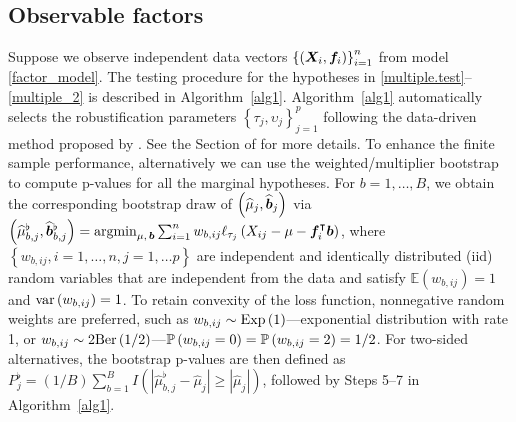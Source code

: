 


\subsection{Observable factors}\label{sec:known_f}
Suppose we observe independent data vectors $\left\{ \left( \bm{X}_i, \bm f_i \right) \right\}_{i=1}^n$ from model \eqref{factor_model}. The testing procedure for the hypotheses in \eqref{multiple.test}--\eqref{multiple_2} is described in Algorithm~\ref{alg1}. Algorithm~\ref{alg1} automatically selects the robustification parameters $\left\{ \tau_j , \upsilon_j \right\}_{j=1}^p$ following the data-driven method proposed by \cite{KMRSZ2019}. See the Section of  for more details. To enhance the finite sample performance, alternatively we can use the weighted/multiplier bootstrap \citep{ZBFL2017,CZ2019} to compute p-values for all the marginal hypotheses. For $b=1,\ldots, B$, we obtain the corresponding bootstrap draw of $\left(\widehat \mu_j, \widehat {\bm{b}}_j\right)$ via $	\left(\widehat \mu^\flat_{b  , j} , \widehat{\bm{b}}^\flat_{b,j}\right) = \mathop{\mathrm{argmin}}_{\mu,  \, \bm{b} }  \sum_{i=1}^n w_{b,ij} \ell_{\tau_j}\left(X_{ij} - \mu - \bm f_i^\intercal \bm{b}\right)$, where $\left\{ w_{b,ij} , i =1,\ldots, n, j=1,\ldots p \right\}$ are independent and identically distributed (iid) random variables that are independent from the data and satisfy $\mathbb{E}\left(w_{b,ij}\right) = 1$ and ${\rm var}\left(w_{b,ij}\right)=1$. To retain convexity of the loss function, nonnegative random weights are preferred, such as $w_{b,ij} \sim {\rm Exp}\left(1\right)$---exponential distribution with rate 1, or $w_{b,ij} \sim 2 {\rm Ber}\left(1/2\right)$---$\mathbb{P}\left(w_{b,ij} = 0\right) = \mathbb{P}\left(w_{b,ij}=2\right) = 1/2$.
For two-sided alternatives, the bootstrap p-values  are then defined as $P^\flat_j= \left(1/B\right)\sum_{b=1}^B  I\left( | \hat \mu^\flat_{b,j} - \hat \mu_j  | \geq |\hat \mu_j |  \right)$, followed by Steps 5--7 in Algorithm~\ref{alg1}.




